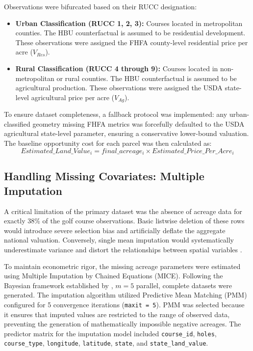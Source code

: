 \documentclass[10pt, letterpaper]{article}
\begin{document}
Observations were bifurcated based on their RUCC designation:
\begin{itemize}
    \item \textbf{Urban Classification (RUCC 1, 2, 3):} Courses located in metropolitan counties. The HBU counterfactual is assumed to be residential development. These observations were assigned the FHFA county-level residential price per acre ($V_{Res}$).
    \item \textbf{Rural Classification (RUCC 4 through 9):} Courses located in non-metropolitan or rural counties. The HBU counterfactual is assumed to be agricultural production. These observations were assigned the USDA state-level agricultural price per acre ($V_{Ag}$).
\end{itemize}
To ensure dataset completeness, a fallback protocol was implemented: any urban-classified geometry missing FHFA metrics was forcefully defaulted to the USDA agricultural state-level parameter, ensuring a conservative lower-bound valuation. The baseline opportunity cost for each parcel was then calculated as:
\begin{equation}
    Estimated\_Land\_Value_i = final\_acreage_i \times Estimated\_Price\_Per\_Acre_i
\end{equation}

\subsection{Handling Missing Covariates: Multiple Imputation}
A critical limitation of the primary dataset was the absence of acreage data for exactly 38\% of the golf course observations. Basic listwise deletion of these rows would introduce severe selection bias and artificially deflate the aggregate national valuation. Conversely, single mean imputation would systematically underestimate variance and distort the relationships between spatial variables \parencite{Burren2018}.

To maintain econometric rigor, the missing acreage parameters were estimated using Multiple Imputation by Chained Equations (MICE). Following the Bayesian framework established by \textcite{Rubin1987}, $m = 5$ parallel, complete datasets were generated. The imputation algorithm utilized Predictive Mean Matching (PMM) configured for 5 convergence iterations (\texttt{maxit = 5}). PMM was selected because it ensures that imputed values are restricted to the range of observed data, preventing the generation of mathematically impossible negative acreages. The predictor matrix for the imputation model included \texttt{course\_id}, \texttt{holes}, \texttt{course\_type}, \texttt{longitude}, \texttt{latitude}, \texttt{state}, and \texttt{state\_land\_value}.
\end{document}
